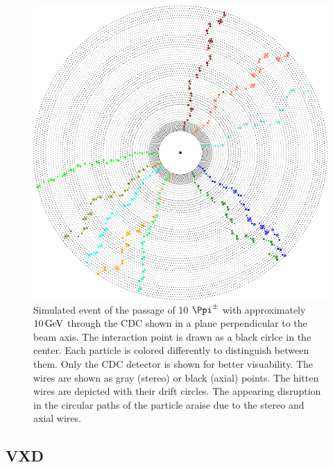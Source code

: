 \begin{figure}
  \centering
  \includegraphics[width=0.8\linewidth]{figures/experimental_setup/eventDisplayPionGun.png}
  \caption{Simulated event of the passage of 10 $\Ppi^\pm$ with approximately $\unit[10]{GeV}$ through the CDC shown in a plane perpendicular to the beam axis. The interaction point is drawn as a black cirlce in the center. Each particle is colored differently to distinguish between them. Only the CDC detector is shown for better visuability. The wires are shown as gray (stereo) or black (axial) points. The hitten wires are depicted with their drift circles. The appearing disruption in the circular paths of the particle araise due to the stereo and axial wires.}
  \label{fig-event-display}
\end{figure}



\subsection{VXD}
